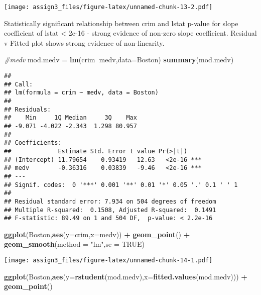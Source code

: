 \documentclass[]{article}
\newenvironment{Shaded}{\begin{snugshade}}{\end{snugshade}}
\newcommand{\CommentTok}[1]{\textcolor[rgb]{0.56,0.35,0.01}{\textit{#1}}}
\newcommand{\DataTypeTok}[1]{\textcolor[rgb]{0.13,0.29,0.53}{#1}}
\newcommand{\KeywordTok}[1]{\textcolor[rgb]{0.13,0.29,0.53}{\textbf{#1}}}
\newcommand{\NormalTok}[1]{#1}
\newcommand{\OperatorTok}[1]{\textcolor[rgb]{0.81,0.36,0.00}{\textbf{#1}}}
\newcommand{\OtherTok}[1]{\textcolor[rgb]{0.56,0.35,0.01}{#1}}
\newcommand{\StringTok}[1]{\textcolor[rgb]{0.31,0.60,0.02}{#1}}
\begin{document}
\texttt{[image: assign3\_files/figure-latex/unnamed-chunk-13-2.pdf]}

Statistically significant relationship between crim and lstat p-value
for slope coefficient of lstat \textless{} 2e-16 - strong evidence of
non-zero slope coefficient. Residual v Fitted plot shows strong evidence
of non-linearity.

\begin{Shaded}
\begin{Highlighting}[]
\CommentTok{#medv}
\NormalTok{mod.medv =}\StringTok{ }\KeywordTok{lm}\NormalTok{(crim}\OperatorTok{~}\NormalTok{medv,}\DataTypeTok{data=}\NormalTok{Boston)}
\KeywordTok{summary}\NormalTok{(mod.medv)}
\end{Highlighting}
\end{Shaded}

\begin{verbatim}
## 
## Call:
## lm(formula = crim ~ medv, data = Boston)
## 
## Residuals:
##    Min     1Q Median     3Q    Max 
## -9.071 -4.022 -2.343  1.298 80.957 
## 
## Coefficients:
##             Estimate Std. Error t value Pr(>|t|)    
## (Intercept) 11.79654    0.93419   12.63   <2e-16 ***
## medv        -0.36316    0.03839   -9.46   <2e-16 ***
## ---
## Signif. codes:  0 '***' 0.001 '**' 0.01 '*' 0.05 '.' 0.1 ' ' 1
## 
## Residual standard error: 7.934 on 504 degrees of freedom
## Multiple R-squared:  0.1508, Adjusted R-squared:  0.1491 
## F-statistic: 89.49 on 1 and 504 DF,  p-value: < 2.2e-16
\end{verbatim}

\begin{Shaded}
\begin{Highlighting}[]
\KeywordTok{ggplot}\NormalTok{(Boston,}\KeywordTok{aes}\NormalTok{(}\DataTypeTok{y=}\NormalTok{crim,}\DataTypeTok{x=}\NormalTok{medv)) }\OperatorTok{+}\StringTok{ }\KeywordTok{geom_point}\NormalTok{() }\OperatorTok{+}\StringTok{ }\KeywordTok{geom_smooth}\NormalTok{(}\DataTypeTok{method =} \StringTok{"lm"}\NormalTok{,}\DataTypeTok{se =} \OtherTok{TRUE}\NormalTok{)}
\end{Highlighting}
\end{Shaded}

\texttt{[image: assign3\_files/figure-latex/unnamed-chunk-14-1.pdf]}

\begin{Shaded}
\begin{Highlighting}[]
\KeywordTok{ggplot}\NormalTok{(Boston,}\KeywordTok{aes}\NormalTok{(}\DataTypeTok{y=}\KeywordTok{rstudent}\NormalTok{(mod.medv),}\DataTypeTok{x=}\KeywordTok{fitted.values}\NormalTok{(mod.medv))) }\OperatorTok{+}\StringTok{ }\KeywordTok{geom_point}\NormalTok{() }
\end{Highlighting}
\end{Shaded}
\end{document}
